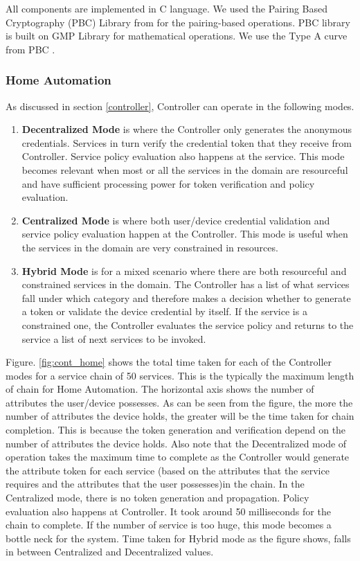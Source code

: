 \documentclass[journal]{IEEEtran}
\begin{document}
All components are implemented in C language. We used the Pairing Based Cryptography (PBC) Library from \cite{pbc} for the pairing-based operations. PBC library is built on GMP Library \cite{gmp} for  mathematical operations. We use the Type A curve from PBC \cite{curve}.

\subsubsection{Home Automation}
As discussed in section \ref{controller}, Controller can operate in the following modes.
\begin{enumerate}[label=\alph*)]
	\item \textbf{Decentralized Mode} is where the Controller only generates the anonymous credentials. Services in turn verify the credential token that they receive from Controller. Service policy evaluation also happens at the service. This mode becomes relevant when most or all the services in the domain are resourceful and have sufficient processing power for token verification and policy evaluation. 
	\item \textbf{Centralized Mode} is where both user/device credential validation and service policy evaluation happen at the Controller. This mode is useful when the services in the domain are very constrained in resources.
	\item \textbf{Hybrid Mode} is for a mixed scenario where there are both resourceful and constrained services in the domain. The Controller has a list of what services fall under which category and therefore makes a decision whether to generate a token or validate the device credential by itself. If the service is a constrained one, the Controller evaluates the service policy and returns to the service a list of next services to be invoked.
\end{enumerate}

Figure. \ref{fig:cont_home} shows the total time taken for each of the Controller modes for a service chain of 50 services. This is the typically the maximum length of chain for Home Automation. The horizontal axis shows the number of attributes the user/device possesses. As can be seen from the figure, the more the number of attributes the device holds, the greater will be the time taken for chain completion. This is because the token generation and verification depend on the number of attributes the device holds. Also note that the Decentralized mode of operation takes the maximum time to complete as the Controller would generate the attribute token for each service (based on the attributes that the service requires and the attributes that the user possesses)in the chain. In the Centralized mode, there is no token generation and propagation. Policy evaluation also happens at Controller. It took around 50 milliseconds for the chain to complete. If the number of service is too huge, this mode becomes a bottle neck for the system. Time taken for Hybrid mode as the figure shows, falls in between Centralized and Decentralized values.
\end{document}
